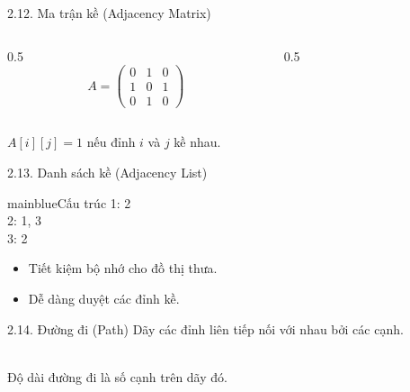 \documentclass[10pt, xcolor={dvipsnames}]{beamer}
\begin{document}
\begin{frame}{2.12. Ma trận kề (Adjacency Matrix)}
    \begin{columns}
        \begin{column}{0.5\textwidth}
            \[ A = \begin{pmatrix} 0 & 1 & 0 \\ 1 & 0 & 1 \\ 0 & 1 & 0 \end{pmatrix} \]
        \end{column}
        \begin{column}{0.5\textwidth}
            \centering
        \end{column}
    \end{columns}
    \small $A[i][j]=1$ nếu đỉnh $i$ và $j$ kề nhau.
\end{frame}

\begin{frame}{2.13. Danh sách kề (Adjacency List)}
    \begin{detailbox}{mainblue}{Cấu trúc}
        1: 2 \\
        2: 1, 3 \\
        3: 2
    \end{detailbox}
    \begin{itemize}
        \item Tiết kiệm bộ nhớ cho đồ thị thưa.
        \item Dễ dàng duyệt các đỉnh kề.
    \end{itemize}
\end{frame}

\begin{frame}{2.14. Đường đi (Path)}
    Dãy các đỉnh liên tiếp nối với nhau bởi các cạnh.
    \centering
    \\ Độ dài đường đi là số cạnh trên dãy đó.
\end{frame}
\end{document}
